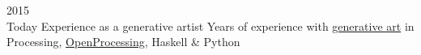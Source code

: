 \documentclass[letterpaper]{twentysecondcv} %
\begin{document}
\begin{twenty} %
	\twentyitem
    	{2015 \\ Today}
        {Experience as a generative artist}
        {}
        {}
        {
            Years of experience with {\color{pblue} \href{https://marceloprates.github.io}{generative art}} in Processing, {\color{pblue} \href{https://www.openprocessing.org/user/45135}{OpenProcessing}}, Haskell \& Python
        }
        
        
\end{twenty}

\cleardoublepage
\end{document}
